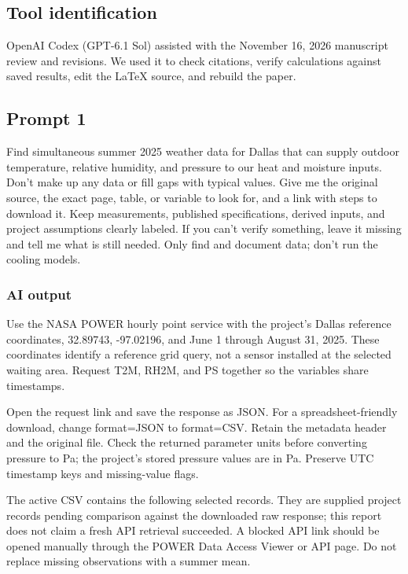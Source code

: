 \subsection*{Tool identification}

\noindent OpenAI Codex (GPT-6.1 Sol) assisted with the November 16, 2026 manuscript review and revisions. We used it to check citations, verify calculations against saved results, edit the LaTeX source, and rebuild the paper.


\subsection*{Prompt 1}
Find simultaneous summer 2025 weather data for Dallas that can supply outdoor temperature, relative humidity, and pressure to our heat and moisture inputs. Don’t make up any data or fill gaps with typical values. Give me the original source, the exact page, table, or variable to look for, and a link with steps to download it. Keep measurements, published specifications, derived inputs, and project assumptions clearly labeled. If you can’t verify something, leave it missing and tell me what is still needed. Only find and document data; don’t run the cooling models.

\subsubsection*{AI output}
Use the NASA POWER hourly point service with the project’s Dallas reference coordinates, 32.89743, -97.02196, and June 1 through August 31, 2025. These coordinates identify a reference grid query, not a sensor installed at the selected waiting area. Request T2M, RH2M, and PS together so the variables share timestamps.

Open the request link and save the response as JSON. For a spreadsheet-friendly download, change format=JSON to format=CSV. Retain the metadata header and the original file. Check the returned parameter units before converting pressure to Pa; the project’s stored pressure values are in Pa. Preserve UTC timestamp keys and missing-value flags.

The active CSV contains the following selected records. They are supplied project records pending comparison against the downloaded raw response; this report does not claim a fresh API retrieval succeeded. A blocked API link should be opened manually through the POWER Data Access Viewer or API page. Do not replace missing observations with a summer mean.

